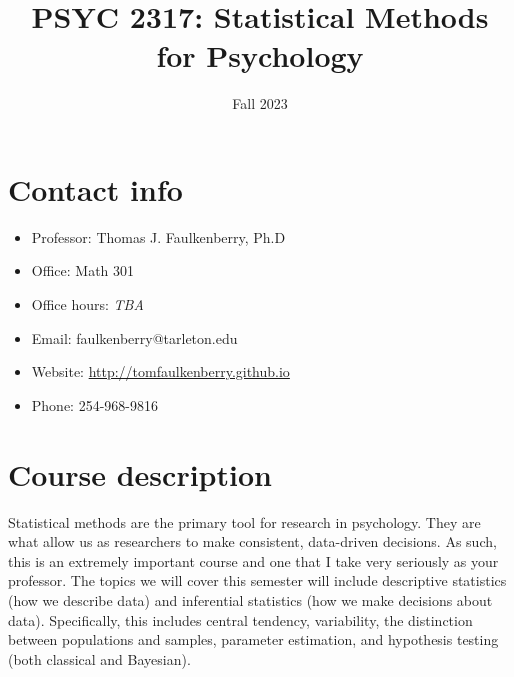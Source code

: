 \documentclass[10pt]{article}
\date{Fall 2023}
\title{PSYC 2317: Statistical Methods for Psychology}
\begin{document}
\maketitle

\section*{Contact info}
\label{sec:orgb08b6ee}
\begin{itemize}
\item Professor: Thomas J. Faulkenberry, Ph.D
\item Office: Math 301
\item Office hours: \emph{TBA}
\item Email: faulkenberry@tarleton.edu
\item Website: \url{http://tomfaulkenberry.github.io}
\item Phone: 254-968-9816
\end{itemize}

\section*{Course description}
\label{sec:org50b572f}

Statistical methods are the primary tool for research in psychology. They are what allow us as researchers to make consistent, data-driven decisions.  As such, this is an extremely important course and one that I take very seriously as your professor. The topics we will cover this semester will include descriptive statistics (how we describe data) and inferential statistics (how we make decisions about data).  Specifically, this includes central tendency, variability, the distinction between populations and samples, parameter estimation, and hypothesis testing (both classical and Bayesian).
\end{document}
